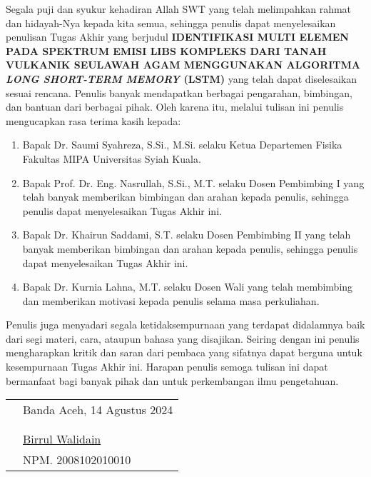 \preface %


Segala puji dan syukur kehadiran Allah SWT yang telah melimpahkan rahmat dan hidayah-Nya kepada kita semua, sehingga penulis dapat menyelesaikan penulisan Tugas Akhir yang berjudul \textbf{{\MakeUppercase{Identifikasi Multi Elemen pada Spektrum Emisi LIBS Kompleks Dari Tanah Vulkanik Seulawah Agam Menggunakan Algoritma \textit{Long Short-Term Memory} (LSTM)}}} yang telah dapat diselesaikan sesuai rencana. Penulis banyak mendapatkan berbagai pengarahan, bimbingan, dan bantuan dari berbagai pihak. Oleh karena itu, melalui tulisan ini penulis mengucapkan rasa terima kasih kepada:

\begin{enumerate} 

	\item {Bapak Dr. Saumi Syahreza, S.Si., M.Si. selaku Ketua Departemen Fisika Fakultas MIPA Universitas Syiah Kuala.}

	\item{Bapak Prof. Dr. Eng. Nasrullah, S.Si., M.T.
 selaku Dosen Pembimbing I yang telah banyak memberikan bimbingan dan arahan kepada penulis, sehingga penulis dapat menyelesaikan Tugas Akhir ini.}
	\item{Bapak Dr. Khairun Saddami, S.T.
 selaku Dosen Pembimbing II yang telah banyak memberikan bimbingan dan arahan kepada penulis, sehingga penulis dapat menyelesaikan Tugas Akhir ini.}

	\item{Bapak Dr. Kurnia Lahna, M.T. selaku Dosen Wali yang telah membimbing
dan memberikan motivasi kepada penulis selama masa perkuliahan.}
\end{enumerate}


Penulis juga menyadari segala ketidaksempurnaan yang terdapat didalamnya baik dari segi materi, cara, ataupun bahasa yang disajikan. Seiring dengan ini penulis mengharapkan kritik dan saran dari pembaca yang sifatnya dapat berguna untuk kesempurnaan Tugas Akhir ini. Harapan penulis semoga tulisan ini dapat bermanfaat bagi banyak pihak dan untuk perkembangan ilmu pengetahuan.

\vspace{1cm}


\begin{tabular}{p{7.5cm}l}
	&Banda Aceh, 14 Agustus 2024\\
	&\\
	&\\
	&\multirow{1.5}{7.5cm}{\underline{Birrul Walidain}} \\ 
	&NPM. 2008102010010 \\
\end{tabular}
